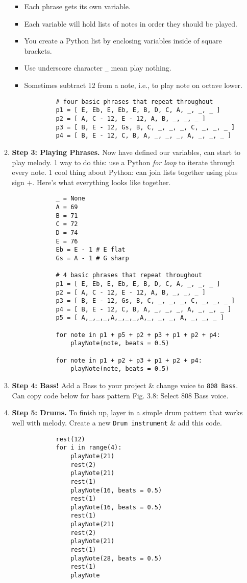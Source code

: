 \documentclass{article}
\begin{document}
\begin{itemize}
\begin{enumerate}
\begin{itemize}
			\item Each phrase gets its own variable.
			\item Each variable will hold lists of notes in order they should be played.
			\item You create a Python list by enclosing variables inside of square brackets.
			\item Use underscore character \verb|_| mean play nothing.
			\item Sometimes subtract 12 from a note, i.e., to play note on octave lower.
		\end{itemize}
		\begin{verbatim}
			# four basic phrases that repeat throughout
			p1 = [ E, Eb, E, Eb, E, B, D, C, A, _, _, _ ]
			p2 = [ A, C - 12, E - 12, A, B, _, _, _ ]
			p3 = [ B, E - 12, Gs, B, C, _, _, _, C, _, _, _ ]
			p4 = [ B, E - 12, C, B, A, _, _, _, A, _, _, _ ]
		\end{verbatim}
		\item {\bf Step 3: Playing Phrases.} Now have defined our variables, can start to play melody. 1 way to do this: use a Python {\it for loop} to iterate through every note. 1 cool thing about Python: can join lists together using plus sign $+$. Here's what everything looks like together.
		\begin{verbatim}
			_ = None
			A = 69
			B = 71
			C = 72
			D = 74
			E = 76
			Eb = E - 1 # E flat
			Gs = A - 1 # G sharp
			
			# 4 basic phrases that repeat throughout
			p1 = [ E, Eb, E, Eb, E, B, D, C, A, _, _, _ ]
			p2 = [ A, C - 12, E - 12, A, B, _, _, _ ]
			p3 = [ B, E - 12, Gs, B, C, _, _, _, C, _, _, _ ]
			p4 = [ B, E - 12, C, B, A, _, _, _, A, _, _, _ ]
			p5 = [ A,_,_,_,A,_,_,_,A,_, _, _, A, _, _, _ ]
			
			for note in p1 + p5 + p2 + p3 + p1 + p2 + p4:
			    playNote(note, beats = 0.5)
			    
			for note in p1 + p2 + p3 + p1 + p2 + p4:
			    playNote(note, beats = 0.5)
		\end{verbatim}
		\item {\bf Step 4: Bass!} Add a Bass to your project \& change voice to {\tt808 Bass}. Can copy code below for bass pattern {\sf Fig. 3.8: Select 808 Bass voice.}
		\item {\bf Step 5: Drums.} To finish up, layer in a simple drum pattern that works well with melody. Create a new {\tt Drum instrument} \& add this code.
		\begin{verbatim}
			rest(12)
			for i in range(4):
			    playNote(21)
			    rest(2)
			    playNote(21)
			    rest(1)
			    playNote(16, beats = 0.5)
			    rest(1)
			    playNote(16, beats = 0.5)
			    rest(1)
			    playNote(21)
			    rest(2)
			    playNote(21)
			    rest(1)
			    playNote(28, beats = 0.5)
			    rest(1)
			    playNote
			

\end{verbatim}
\end{enumerate}
\end{itemize}
\end{document}
